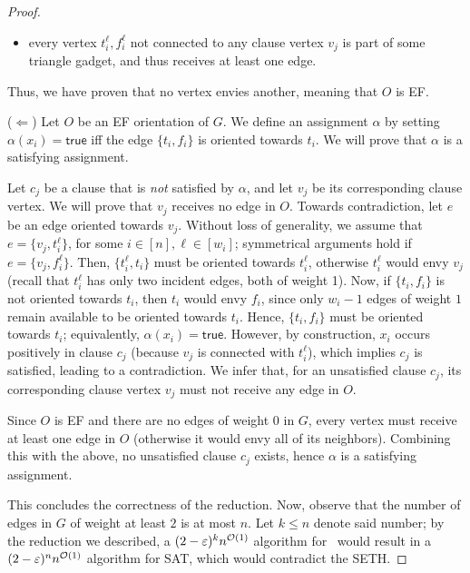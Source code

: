 \begin{proof}
\begin{itemize}
        \item every vertex $t_i^\ell, f_i^\ell$ not connected to any clause vertex $v_j$ is part of some triangle gadget, and thus receives at least one edge.
    \end{itemize}

    Thus, we have proven that no vertex envies another, meaning that $O$ is EF.

    \medskip

    ($\Leftarrow$)
    Let $O$ be an EF orientation of $G$. We define an assignment $\alpha$ by setting $\alpha(x_i)=\mathsf{true}$ iff the edge $\{t_i,f_i\}$ is oriented towards $t_i$. We will prove that $\alpha$ is a satisfying assignment.

    Let $c_j$ be a clause that is \emph{not} satisfied by $\alpha$, and let $v_j$ be its corresponding clause vertex. We will prove that $v_j$ receives no edge in $O$.
    Towards contradiction, let $e$ be an edge oriented towards $v_j$. Without loss of generality, we assume that $e = \{v_j,t^\ell_i\}$, for some $i\in [n], \ell \in [w_i]$; symmetrical arguments hold if $e = \{v_j,f^\ell_i\}$. Then, $\{t^\ell_i,t_i\}$ must be oriented towards $t^\ell_i$, otherwise $t^\ell_i$ would envy $v_j$ (recall that $t^\ell_i$ has only two incident edges, both of weight 1). Now, if $\{t_i,f_i\}$ is not oriented towards $t_i$, then $t_i$ would envy $f_i$, since only $w_i-1$ edges of weight $1$ remain available to be oriented towards $t_i$. Hence, $\{t_i,f_i\}$ must be oriented towards $t_i$; equivalently, $\alpha(x_i)=\mathsf{true}$. However, by construction, $x_i$ occurs positively in clause $c_j$ (because $v_j$ is connected with $t_i^\ell$), which implies $c_j$ is satisfied, leading to a contradiction. We infer that, for an unsatisfied clause $c_j$, its corresponding clause vertex $v_j$ must not receive any edge in $O$.

    Since $O$ is EF and there are no edges of weight $0$ in $G$, every vertex must receive at least one edge in $O$ (otherwise it would envy all of its neighbors).
    Combining this with the above, no unsatisfied clause $c_j$ exists, hence $\alpha$ is a satisfying assignment.


    \medskip

    This concludes the correctness of the reduction. Now, observe that the number of edges in $G$ of weight at least $2$ is at most $n$.
    Let $k \le n$ denote said number; by the reduction we described, a $(2-\varepsilon)^k n^{\mathcal{O}(1)}$ algorithm for \EFo\ would result in a
    $(2-\varepsilon)^n n^{\mathcal{O}(1)}$ algorithm for SAT, which would contradict the SETH.
\end{proof}


